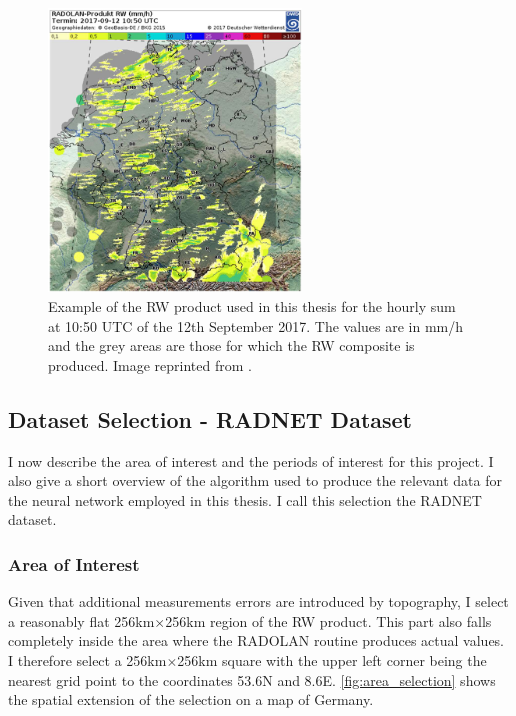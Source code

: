 \begin{figure}[h!]
    \centering
    \includegraphics[width=0.6\textwidth]{RADOLAN_EXAMPLE.png}
    \caption{Example of the RW product used in this thesis for the hourly sum at 10:50 UTC of the 12th September 2017. The values are in mm/h and the grey areas are those for which the RW composite is produced. Image reprinted from \citet{Weigl2021RADOLAN/RADVOR2.5.3}.}
    \label{fig:radolanexample}
\end{figure}
\subsection{Dataset Selection - RADNET Dataset} \label{sec:radnet}
I now describe the area of interest and the periods of interest for this project. I also give a short overview of the algorithm used to produce the relevant data for the neural network employed in this thesis. I call this selection the RADNET dataset.
\subsubsection{Area of Interest}
Given that additional measurements errors are introduced by topography, I select a reasonably flat 256km$\times$256km region of the RW product. This part also falls completely inside the area where the RADOLAN routine produces actual values. I therefore select a 256km$\times$256km square with the upper left corner being the nearest grid point to the coordinates 53.6\textdegree N and 8.6\textdegree E. \cref{fig:area_selection} shows the spatial extension of the selection on a map of Germany.

